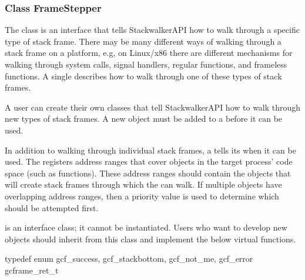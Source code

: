 \subsubsection{Class FrameStepper}\label{subsec:framestepper}
	
The  class is an interface that tells StackwalkerAPI how to walk
through a specific type of stack frame. There may be many different ways of
walking through a stack frame on a platform, e.g, on Linux/x86 there are
different mechanisms for walking through system calls, signal handlers, regular
functions, and frameless functions. A single  describes how to walk
through one of these types of stack frames.

A user can create their own  classes that tell StackwalkerAPI how to
walk through new types of stack frames. A new  object must be added
to a  before it can be used. 

In addition to walking through individual stack frames, a  tells its
 when it can be used. The  registers address ranges that
cover objects in the target process' code space (such as functions). These
address ranges should contain the objects that will create stack frames through
which the  can walk. If multiple  objects have
overlapping address ranges, then a priority value is used to determine which
 should be attempted first.

 is an interface class; it cannot be instantiated. Users who want to
develop new  objects should inherit from this class and implement
the below virtual functions.

\begin{apient}
typedef enum { 
    gcf_success,
    gcf_stackbottom,
    gcf_not_me, 
    gcf_error 
} gcframe_ret_t
\end{apient}

